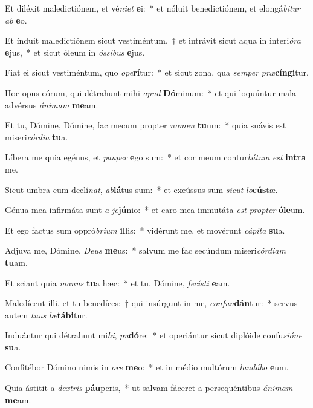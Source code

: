 \item Et diléxit maledictiónem, et vé\textit{ni}\textit{et} \textbf{e}i:~* et nóluit benedictiónem, et elongá\textit{bi}\textit{tur} \textit{ab} \textbf{e}o.
\item Et índuit maledictiónem sicut vestiméntum,~† et intrávit sicut aqua in interi\textit{ó}\textit{ra} \textbf{e}jus,~* et sicut óleum in \textit{ós}\textit{si}\textit{bus} \textbf{e}jus.
\item Fiat ei sicut vestiméntum, quo \textit{o}\textit{pe}\textbf{rí}tur:~* et sicut zona, qua \textit{sem}\textit{per} \textit{præ}\textbf{cín}\textbf{gi}tur.
\item Hoc opus eórum, qui détrahunt mihi \textit{a}\textit{pud} \textbf{Dó}minum:~* et qui loquúntur mala advérsus \textit{á}\textit{ni}\textit{mam} \textbf{me}am.
\item Et tu, Dómine, Dómine, fac mecum propter \textit{no}\textit{men} \textbf{tu}um:~* quia suávis est miseri\textit{cór}\textit{di}\textit{a} \textbf{tu}a.
\item Líbera me quia egénus, et \textit{pau}\textit{per} \textbf{e}go sum:~* et cor meum contur\textit{bá}\textit{tum} \textit{est} \textbf{in}\textbf{tra} me.
\item Sicut umbra cum declí\textit{nat}, \textit{ab}\textbf{lá}tus sum:~* et excússus sum \textit{sic}\textit{ut} \textit{lo}\textbf{cús}tæ.
\item Génua mea infirmáta sunt \textit{a} \textit{je}\textbf{jú}nio:~* et caro mea immutáta \textit{est} \textit{prop}\textit{ter} \textbf{ó}\textbf{le}um.
\item Et ego factus sum oppró\textit{bri}\textit{um} \textbf{il}lis:~* vidérunt me, et movérunt \textit{cá}\textit{pi}\textit{ta} \textbf{su}a.
\item Adjuva me, Dómine, \textit{De}\textit{us} \textbf{me}us:~* salvum me fac secúndum miseri\textit{cór}\textit{di}\textit{am} \textbf{tu}am.
\item Et sciant quia \textit{ma}\textit{nus} \textbf{tu}a hæc:~* et tu, Dómine, \textit{fe}\textit{cís}\textit{ti} \textbf{e}am.
\item Maledícent illi, et tu benedíces:~† qui insúrgunt in me, \textit{con}\textit{fun}\textbf{dán}tur:~* servus autem \textit{tu}\textit{us} \textit{læ}\textbf{tá}\textbf{bi}tur.
\item Induántur qui détrahunt mi\textit{hi}, \textit{pu}\textbf{dó}re:~* et operiántur sicut diplóide confu\textit{si}\textit{ó}\textit{ne} \textbf{su}a.
\item Confitébor Dómino nimis in \textit{o}\textit{re} \textbf{me}o:~* et in médio multórum \textit{lau}\textit{dá}\textit{bo} \textbf{e}um.
\item Quia ástitit a \textit{dex}\textit{tris} \textbf{páu}peris,~* ut salvam fáceret a persequéntibus \textit{á}\textit{ni}\textit{mam} \textbf{me}am.
